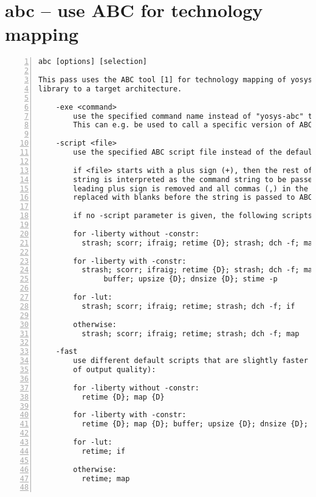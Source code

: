 
\section{abc -- use ABC for technology mapping}
\label{cmd:abc}
\begin{lstlisting}[numbers=left,frame=single]
    abc [options] [selection]

This pass uses the ABC tool [1] for technology mapping of yosys's internal gate
library to a target architecture.

    -exe <command>
        use the specified command name instead of "yosys-abc" to execute ABC.
        This can e.g. be used to call a specific version of ABC or a wrapper.

    -script <file>
        use the specified ABC script file instead of the default script.

        if <file> starts with a plus sign (+), then the rest of the filename
        string is interpreted as the command string to be passed to ABC. The
        leading plus sign is removed and all commas (,) in the string are
        replaced with blanks before the string is passed to ABC.

        if no -script parameter is given, the following scripts are used:

        for -liberty without -constr:
          strash; scorr; ifraig; retime {D}; strash; dch -f; map {D}

        for -liberty with -constr:
          strash; scorr; ifraig; retime {D}; strash; dch -f; map {D};
               buffer; upsize {D}; dnsize {D}; stime -p

        for -lut:
          strash; scorr; ifraig; retime; strash; dch -f; if

        otherwise:
          strash; scorr; ifraig; retime; strash; dch -f; map

    -fast
        use different default scripts that are slightly faster (at the cost
        of output quality):

        for -liberty without -constr:
          retime {D}; map {D}

        for -liberty with -constr:
          retime {D}; map {D}; buffer; upsize {D}; dnsize {D}; stime -p

        for -lut:
          retime; if

        otherwise:
          retime; map


\end{lstlisting}
